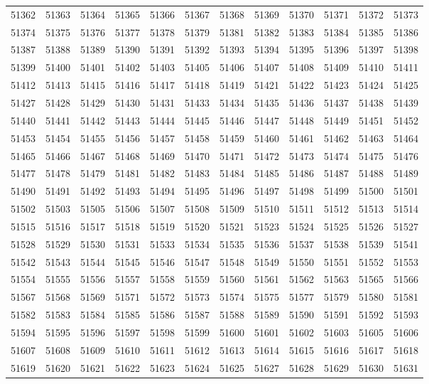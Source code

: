 \begin{center}
\begin{longtable}{llllllllllll}
51362 &51363 &51364 &51365 &51366 &51367 &51368 &51369 &51370 &51371 &51372 &51373 \\
51374 &51375 &51376 &51377 &51378 &51379 &51381 &51382 &51383 &51384 &51385 &51386 \\
51387 &51388 &51389 &51390 &51391 &51392 &51393 &51394 &51395 &51396 &51397 &51398 \\
51399 &51400 &51401 &51402 &51403 &51405 &51406 &51407 &51408 &51409 &51410 &51411 \\
51412 &51413 &51415 &51416 &51417 &51418 &51419 &51421 &51422 &51423 &51424 &51425 \\
51427 &51428 &51429 &51430 &51431 &51433 &51434 &51435 &51436 &51437 &51438 &51439 \\
51440 &51441 &51442 &51443 &51444 &51445 &51446 &51447 &51448 &51449 &51451 &51452 \\
51453 &51454 &51455 &51456 &51457 &51458 &51459 &51460 &51461 &51462 &51463 &51464 \\
51465 &51466 &51467 &51468 &51469 &51470 &51471 &51472 &51473 &51474 &51475 &51476 \\
51477 &51478 &51479 &51481 &51482 &51483 &51484 &51485 &51486 &51487 &51488 &51489 \\
51490 &51491 &51492 &51493 &51494 &51495 &51496 &51497 &51498 &51499 &51500 &51501 \\
51502 &51503 &51505 &51506 &51507 &51508 &51509 &51510 &51511 &51512 &51513 &51514 \\
51515 &51516 &51517 &51518 &51519 &51520 &51521 &51523 &51524 &51525 &51526 &51527 \\
51528 &51529 &51530 &51531 &51533 &51534 &51535 &51536 &51537 &51538 &51539 &51541 \\
51542 &51543 &51544 &51545 &51546 &51547 &51548 &51549 &51550 &51551 &51552 &51553 \\
51554 &51555 &51556 &51557 &51558 &51559 &51560 &51561 &51562 &51563 &51565 &51566 \\
51567 &51568 &51569 &51571 &51572 &51573 &51574 &51575 &51577 &51579 &51580 &51581 \\
51582 &51583 &51584 &51585 &51586 &51587 &51588 &51589 &51590 &51591 &51592 &51593 \\
51594 &51595 &51596 &51597 &51598 &51599 &51600 &51601 &51602 &51603 &51605 &51606 \\
51607 &51608 &51609 &51610 &51611 &51612 &51613 &51614 &51615 &51616 &51617 &51618 \\
51619 &51620 &51621 &51622 &51623 &51624 &51625 &51627 &51628 &51629 &51630 &51631 \\

\end{longtable}
\end{center}
